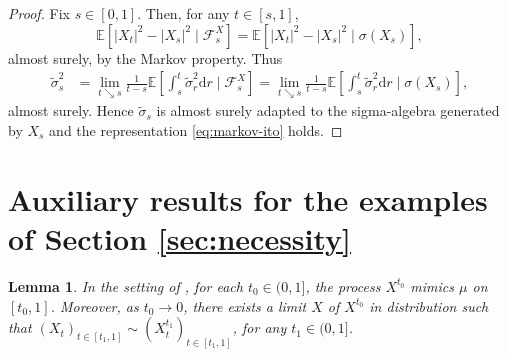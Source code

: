 \documentclass[12pt,oneside]{amsart}
\newtheorem{lemma}[theorem]{Lemma}
\theoremstyle{definition}
\newcommand{\F}{\mathcal F}
\newcommand{\D}{\mathrm{d}}
\def\E{{\mathbb E}}
\numberwithin{equation}{section}
\begin{document}
\begin{proof}
	Fix $s \in [0, 1]$. Then, for any $t \in [s, 1]$,
	\begin{equation}
		\E [|X_t|^2 - |X_s|^2 \mid \F^X_s] = \E [|X_t|^2 - |X_s|^2 \mid \sigma(X_s)],
	\end{equation}
	almost surely, by the Markov property. Thus
	\begin{equation}
		\begin{split}
			\tilde \sigma_s^2 & = \lim_{t \searrow s}\frac{1}{t -s}\E\!\left[\int_s^t \tilde \sigma_r^2 \D r \mid \F^X_s\right]\! = \lim_{t \searrow s}\frac{1}{t -s}\E\!\left[\int_s^t \tilde \sigma_r^2 \D r \mid \sigma(X_s)\right]\!,
		\end{split}
	\end{equation}
	almost surely. Hence $\tilde \sigma_s$ is almost surely adapted to the sigma-algebra generated by $X_s$ and the representation \eqref{eq:markov-ito} holds.
\end{proof}

\section{Auxiliary results for the examples of Section \ref{sec:necessity}}\label{app:B}

\begin{lemma}\label{lem:app-rem-1}
	In the setting of , for each $t_0 \in (0, 1]$, the process $X^{t_0}$ mimics $\mu$ on $[t_0, 1]$. Moreover, as $t_0 \to 0$, there exists a limit $X$ of $X^{t_0}$ in distribution such that $(X_t)_{t \in [t_1,1]} \sim (X^{t_1}_t)_{t \in [t_1,1]}$, for any $t_1 \in (0, 1]$.
\end{lemma}
\end{document}

